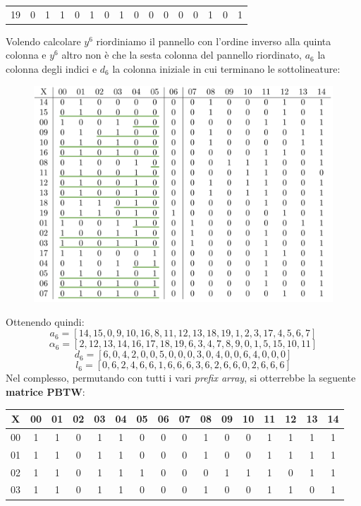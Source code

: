 \begin{esempio}
\begin{table}[H]
\begin{tabular}{c|ccccccccccccccc}
      19 & 0 & 1 & 1 & 0 & 1 & 0 & 1 & 0 & 0 & 0 & 0 & 0 & 1 & 0 & 1 
    \end{tabular}
  \end{table}
  Volendo calcolare $y^6$ riordiniamo il pannello con l'ordine inverso alla
  quinta colonna e $y^6$ altro non è che la sesta colonna del pannello
  riordinato, $a_6$ la colonna degli indici e $d_6$ la colonna iniziale in cui
  terminano le sottolineature:  
  \begin{figure}[H]
    \centering
    \includegraphics[scale = 0.365]{img/matrix1.pdf}
  \end{figure}
  Ottenendo quindi:
  \[a_6=[14,15,0,9,10,16,8,11,12,13,18,19,1,2,3,17,4,5,6,7]\]
  \[\alpha_6=[2,12,13,14,16,17,18,19,6,3,4,7,8,9,0,1,5,15,10,11]\]
  \[d_6=[6,0,4,2,0,0,5,0,0,0,3,0,4,0,0,6,4,0,0,0]\]
  \[l_6=[0,6,2,4,6,6,1,6,6,6,3,6,2,6,6,0,2,6,6,6]\]
  Nel complesso, permutando con tutti i vari \textit{prefix array}, si
  otterrebbe la seguente \textbf{matrice PBTW}:
  \begin{table}[H]
  \centering
  \footnotesize
  \begin{tabular}{c|ccccccccccccccc}
    X & 00 & 01 & 02 & 03 & 04 & 05 & 06 & 07 & 08 & 09 & 10 & 11 & 12 & 13
    & 14 \\
    \hline
    00 & 1 & 1 & 0 & 1 & 1 & 0 & 0 & 0 & 1 & 0 & 0 & 1 & 1 & 1 & 1 \\
    01 & 1 & 1 & 0 & 1 & 1 & 0 & 0 & 0 & 1 & 0 & 0 & 1 & 1 & 1 & 1 \\
    02 & 1 & 1 & 0 & 1 & 1 & 1 & 0 & 0 & 0 & 1 & 1 & 1 & 0 & 1 & 1 \\
    03 & 1 & 1 & 0 & 1 & 1 & 0 & 0 & 0 & 1 & 0 & 0 & 1 & 1 & 0 & 1 \\

\end{tabular}
\end{table}
\end{esempio}
